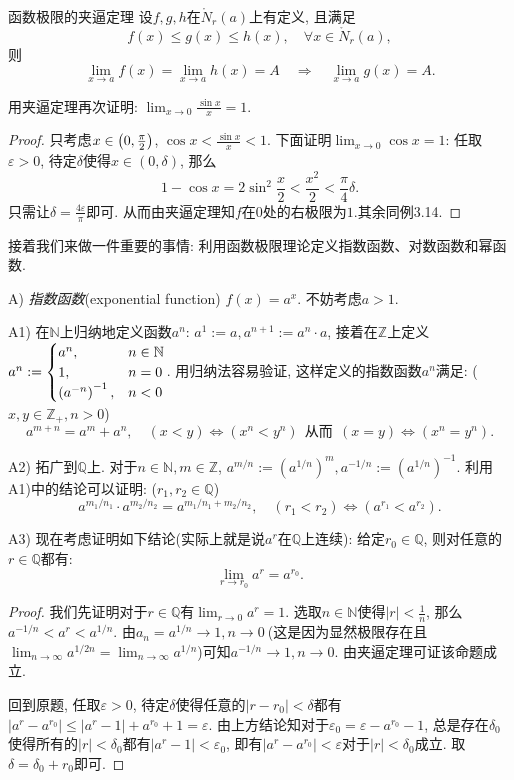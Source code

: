 \begin{theorem}{函数极限的夹逼定理}
	设$f,g,h$在$\mathring{N}_r(a)$上有定义, 且满足$$f(x) \leq g(x) \leq h(x), \quad \forall x \in \mathring{N}_r(a),$$则$$\lim_{x\to a}f(x) = \lim_{x\to a}h(x) = A \quad \Rightarrow \quad \lim_{x\to a}g(x)=A.$$
\end{theorem}

\begin{example}
	用夹逼定理再次证明: $\lim_{x\to 0} \frac{\sin x}{x} = 1$.
\end{example}
\begin{proof}
	只考虑$x\in \left( 0,\frac{\pi}{2} \right)$, $\cos x < \frac{\sin x}{x} < 1$. 下面证明$\lim_{x\to 0}\cos x=1$: 任取$\varepsilon >0$, 待定$\delta$使得$x \in (0,\delta)$, 那么$$1-\cos x = 2\sin ^2 \frac{x}{2} < \frac{x^2}{2}<\frac{\pi}{4}\delta .$$只需让$\delta = \frac{4\varepsilon}{\pi}$即可. 从而由夹逼定理知$f$在$0$处的右极限为$1$.其余同例3.14. 
\end{proof}



接着我们来做一件重要的事情: 利用函数极限理论定义指数函数、对数函数和幂函数. 

A) \textit{指数函数}(exponential function) $f(x)=a^x$. 不妨考虑$a>1$. 

A1) 在$\mathbb{N}$上归纳地定义函数$a^n$: $a^1:=a, a^{n+1}:=a^n \cdot a$, 接着在$\mathbb{Z}$上定义$a^n:=\begin{cases}
	a^n, &n\in \mathbb{N} \\ 1, &n=0 \\ \left( a^{-n} \right)^{-1}, &n<0
\end{cases}$. 用归纳法容易验证, 这样定义的指数函数$a^n$满足: ($x,y \in \mathbb{Z}_+,n>0$)$$a^{m+n}=a^m+a^n,\quad (x<y) \Leftrightarrow (x^n<y^n)  ~~\textit{从而} ~~ (x=y) \Leftrightarrow (x^n=y^n).$$

A2) 拓广到$\mathbb{Q}$上. 对于$n\in \mathbb{N},m\in \mathbb{Z}$, $a^{m/n}:= (a^{1/n})^m, a^{-1/n}:=(a^{1/n})^{-1}$. 利用A1)中的结论可以证明: ($r_1,r_2 \in \mathbb{Q}$) $$a^{m_1/n_1} \cdot a^{m_2/n_2} = a^{m_1/n_1+m_2/n_2},\quad (r_1<r_2) \Leftrightarrow (a^{r_1} < a^{r_2}).$$

A3) 现在考虑证明如下结论(实际上就是说$a^r$在$\mathbb{Q}$上连续): 给定$r_0 \in \mathbb{Q}$, 则对任意的$r \in \mathbb{Q}$都有: $$\lim_{r \to r_0} a^r = a^{r_0}.$$
\begin{proof}
	我们先证明对于$r \in \mathbb{Q}$有$\lim_{r\to 0} a^r = 1$. 选取$n \in \mathbb{N}$使得$|r|<\frac{1}{n}$, 那么$a^{-1/n} < a^r < a^{1/n}$. 由$a_n = a^{1/n} \to 1, n\to 0~$(这是因为显然极限存在且$\lim_{n\to \infty} a^{1/2n} = \lim_{n\to \infty} a^{1/n}$)可知$a^{-1/n} \to 1, n\to 0$. 由夹逼定理可证该命题成立. 
	
	回到原题, 任取$\varepsilon >0$, 待定$\delta$使得任意的$|r-r_0|<\delta$都有$|a^r-a^{r_0}|\leq |a^r-1|+a^{r_0}+1=\varepsilon$. 由上方结论知对于$\varepsilon _0 = \varepsilon - a^{r_0} -1$, 总是存在$\delta _0$使得所有的$|r|<\delta _0$都有$|a^r-1|<\varepsilon _0$, 即有$|a^r-a^{r_0}|<\varepsilon$对于$|r|<\delta _0$成立. 取$\delta = \delta _0+r_0$即可. 
\end{proof}

